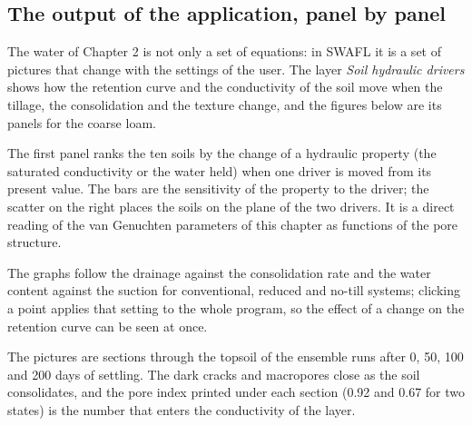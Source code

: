 \subsection{The output of the application, panel by panel}
The water of Chapter 2 is not only a set of equations: in SWAFL it is a set of pictures that change with the settings of the user. The layer \emph{Soil hydraulic drivers} shows how the retention curve and the conductivity of the soil move when the tillage, the consolidation and the texture change, and the figures below are its panels for the coarse loam.

The first panel ranks the ten soils by the change of a hydraulic property (the saturated conductivity or the water held) when one driver is moved from its present value. The bars are the sensitivity of the property to the driver; the scatter on the right places the soils on the plane of the two drivers. It is a direct reading of the van Genuchten parameters of this chapter as functions of the pore structure.


The graphs follow the drainage against the consolidation rate and the water content against the suction for conventional, reduced and no-till systems; clicking a point applies that setting to the whole program, so the effect of a change on the retention curve can be seen at once.


The pictures are sections through the topsoil of the ensemble runs after 0, 50, 100 and 200 days of settling. The dark cracks and macropores close as the soil consolidates, and the pore index printed under each section (0.92 and 0.67 for two states) is the number that enters the conductivity of the layer.


